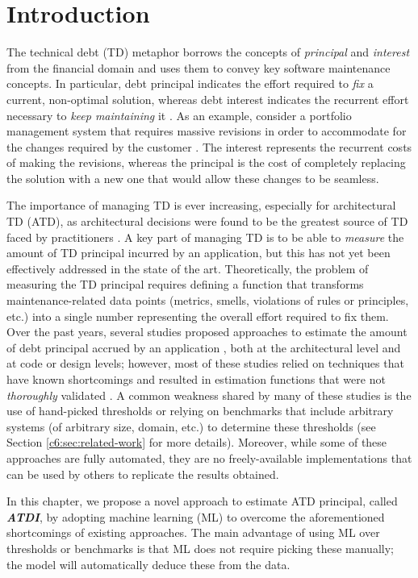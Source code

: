 \section{Introduction}\label{c6:sec:Intro}
The technical debt (TD) metaphor borrows the concepts of \emph{principal} and \emph{interest} from the financial domain and uses them to convey key software maintenance concepts.
In particular, debt principal indicates the effort required to \emph{fix} a current, non-optimal solution, whereas debt interest indicates the recurrent effort necessary to \emph{keep maintaining} it \cite{Avgeriou2016}.
As an example, consider a portfolio management system that requires massive revisions in order to accommodate for the changes required by the customer \cite{Cunningham1992}. The interest represents the recurrent costs of making the revisions, whereas the principal is the cost of completely replacing the solution with a new one that would allow these changes to be seamless.

The importance of managing TD is ever increasing, especially for architectural TD (ATD), as architectural decisions were found to be the greatest source of TD faced by practitioners \cite{Ernst2015}.
A key part of managing TD is to be able to \emph{measure} the amount of TD principal incurred by an application, but this has not yet been effectively addressed in the state of the art.
Theoretically, the problem of measuring the TD principal requires defining a function that transforms maintenance-related data points (metrics, smells, violations of rules or principles, etc.) into a single number representing the overall effort required to fix them.
Over the past years, several studies proposed approaches to estimate the amount of debt principal accrued by an application \cite{Khomyakov2020,Avgeriou2021}, both at the architectural level and at code or design levels; however, most of these studies relied on techniques that have known shortcomings and resulted in estimation functions that were not \emph{thoroughly} validated \cite{Khomyakov2020}.
A common weakness shared by many of these studies is the use of hand-picked thresholds or relying on benchmarks that include arbitrary systems (of arbitrary size, domain, etc.) to determine these thresholds (see Section \ref{c6:sec:related-work} for more details).
Moreover, while some of these approaches are fully automated, they are no freely-available implementations that can be used by others to replicate the results obtained.

In this chapter, we propose a novel approach to estimate ATD principal, called \textbf{\emph{ATDI}}, by adopting machine learning (ML) to overcome the aforementioned shortcomings of existing approaches.
The main advantage of using ML over thresholds or benchmarks is that ML does not require picking these manually; the model will automatically deduce these from the data.

